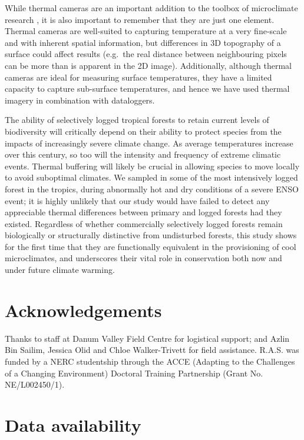 \documentclass[12pt,a4paper,]{report}
\theoremstyle{definition}
\theoremstyle{definition}
\theoremstyle{definition}
\theoremstyle{remark}
\begin{document}
While thermal cameras are an important addition to the toolbox of
microclimate research \citep{faye_toolbox2016}, it is also important to
remember that they are just one element. Thermal cameras are well-suited
to capturing temperature at a very fine-scale and with inherent spatial
information, but differences in 3D topography of a surface could affect
results (e.g.~the real distance between neighbouring pixels can be more
than is apparent in the 2D image). Additionally, although thermal
cameras are ideal for measuring surface temperatures, they have a
limited capacity to capture sub-surface temperatures, and hence we have
used thermal imagery in combination with dataloggers.

The ability of selectively logged tropical forests to retain current
levels of biodiversity will critically depend on their ability to
protect species from the impacts of increasingly severe climate change.
As average temperatures increase over this century, so too will the
intensity and frequency of extreme climatic events. Thermal buffering
will likely be crucial in allowing species to move locally to avoid
suboptimal climates. We sampled in some of the most intensively logged
forest in the tropics, during abnormally hot and dry conditions of a
severe ENSO event; it is highly unlikely that our study would have
failed to detect any appreciable thermal differences between primary and
logged forests had they existed. Regardless of whether commercially
selectively logged forests remain biologically or structurally
distinctive from undisturbed forests, this study shows for the first
time that they are functionally equivalent in the provisioning of cool
microclimates, and underscores their vital role in conservation both now
and under future climate warming.

\section{Acknowledgements}\label{acknowledgements-1}

Thanks to staff at Danum Valley Field Centre for logistical support; and
Azlin Bin Sailim, Jessica Olid and Chloe Walker-Trivett for field
assistance. R.A.S. was funded by a NERC studentship through the ACCE
(Adapting to the Challenges of a Changing Environment) Doctoral Training
Partnership (Grant No. NE/L002450/1).

\section{Data availability}\label{data-availability}
\end{document}
